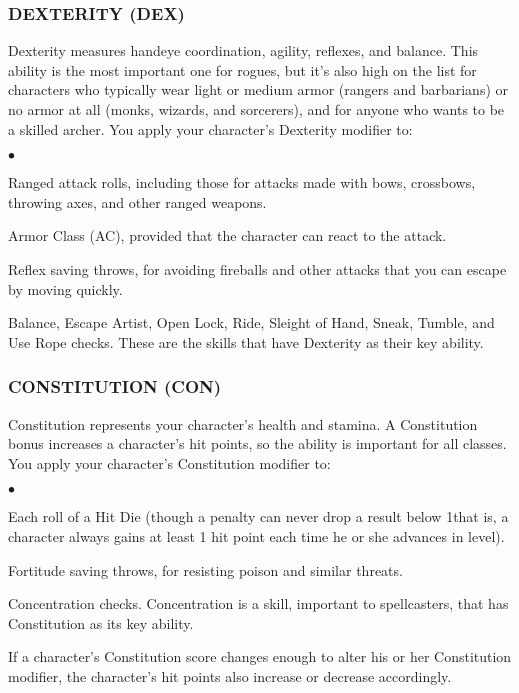 \subsubsection{DEXTERITY (DEX)}

Dexterity measures hand\textendash eye coordination, agility, reflexes, and balance. This ability is the most important one for rogues, but it's also high on the list for characters who typically wear light or medium armor (rangers and barbarians) or no armor at all (monks, wizards, and sorcerers), and for anyone who wants to be a skilled archer.
You apply your character's Dexterity modifier to:
\begin{list}{$\bullet$}{\itemspace}
	\item Ranged attack rolls, including those for attacks made with bows, crossbows, throwing axes, and other ranged weapons.
	\item Armor Class (AC), provided that the character can react to the attack.
	\item Reflex saving throws, for avoiding fireballs and other attacks that you can escape by moving quickly.
	\item Balance, Escape Artist, Open Lock, Ride, Sleight of Hand, Sneak, Tumble, and Use Rope checks. These are the skills that have Dexterity as their key ability.
\end{list}

\subsubsection{CONSTITUTION (CON)}

Constitution represents your character's health and stamina. A Constitution bonus increases a character's hit points, so the ability is important for all classes.
You apply your character's Constitution modifier to:
\begin{list}{$\bullet$}{\itemspace}
	\item Each roll of a Hit Die (though a penalty can never drop a result below 1\textendash that is, a character always gains at least 1 hit point each time he or she advances in level).
	\item Fortitude saving throws, for resisting poison and similar threats.
	\item Concentration checks. Concentration is a skill, important to spellcasters, that has Constitution as its key ability.
	\item If a character's Constitution score changes enough to alter his or her Constitution modifier, the character's hit points also increase or decrease accordingly.
\end{list}

